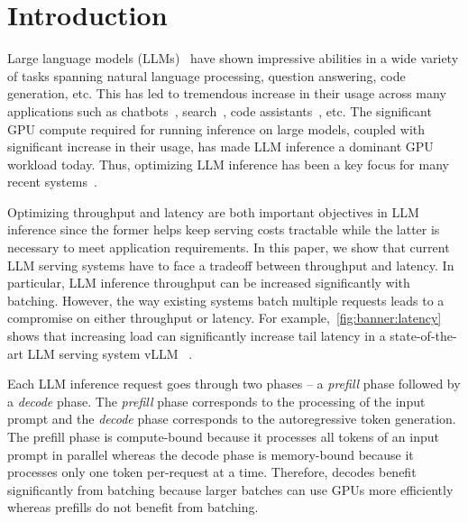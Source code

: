 \section{Introduction}\label{sec:Introduction}



Large language models (LLMs)~\cite{wei2022emergent,gpt3-brown2020language,chowdhery2022Palm,openai2022gpt4techreport,kaplan2020scalinglaws} have shown impressive abilities in a wide variety of tasks spanning natural language processing, question answering, code generation, etc. This has led to tremendous increase in their usage across many applications such as chatbots~\cite{openai2022gpt4techreport,chatgpt,claudeai,characterai}, search~\cite{bingai,komoai,youdotcom,perplexityai,bard}, code assistants~\cite{githubcopilot,replitghostwriter,amazoncodewhisperer}, etc. The significant GPU compute required for running inference on large models, coupled with significant increase in their usage, has made LLM inference a dominant GPU workload today. Thus, optimizing LLM inference has been a key focus for many recent systems~\cite{efficiently-scaling-transformer-inference,flexgen,orca,vllmsosp,patel2023splitwise,distserve2024,sarathi2023}.



Optimizing throughput and latency are both important objectives in LLM inference since the former helps keep 
serving costs tractable while the latter is necessary to meet application requirements. In this paper, we show that current LLM serving systems have to face a tradeoff between throughput and latency. In particular, LLM inference throughput can be increased significantly with batching. However, the way existing systems batch multiple requests leads to a compromise on either throughput or latency. For example,~\autoref{fig:banner:latency} shows that increasing load can significantly increase tail latency in a state-of-the-art LLM serving system vLLM ~\cite{vllmsosp}.


Each LLM inference request goes through two phases -- a \textit{prefill} phase followed by a \textit{decode} phase. The \textit{prefill} phase corresponds to the processing of the input prompt and the \textit{decode} phase corresponds to the autoregressive token generation. The prefill phase is compute-bound because it processes all tokens of an input prompt in parallel whereas the decode phase is memory-bound because it processes only one token per-request at a time. Therefore, decodes benefit significantly from batching because larger batches can use GPUs more efficiently whereas prefills do not benefit from batching.


